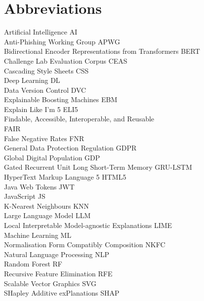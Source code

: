 
\section*{Abbreviations}

\large
Artificial Intelligence \hfill AI\\
Anti-Phishing Working Group \hfill APWG\\
Bidirectional Encoder Representations from Transformers \hfill BERT\\
Challenge Lab Evaluation Corpus \hfill CEAS\\
Cascading Style Sheets \hfill CSS\\
Deep Learning \hfill DL\\
Data Version Control \hfill DVC\\
Explainable Boosting Machines \hfill EBM\\
Explain Like I'm 5 \hfill ELI5\\
Findable, Accessible, Interoperable, and Reusable \hfill \\ FAIR \\
False Negative Rates \hfill FNR\\
General Data Protection Regulation \hfill GDPR\\
Global Digital Population \hfill GDP\\
Gated Recurrent Unit Long Short-Term Memory \hfill GRU-LSTM\\
HyperText Markup Language 5 \hfill HTML5\\
Java Web Tokens \hfill JWT\\
JavaScript \hfill JS\\
K-Nearest Neighbours \hfill KNN\\
Large Language Model \hfill LLM\\
Local Interpretable Model-agnostic Explanations \hfill LIME\\
Machine Learning \hfill ML\\
Normalisation Form Compatibly Composition \hfill NKFC\\
Natural Language Processing \hfill NLP\\
Random Forest \hfill RF\\
Recursive Feature Elimination \hfill RFE\\
Scalable Vector Graphics \hfill SVG\\
SHapley Additive exPlanations \hfill SHAP\\
